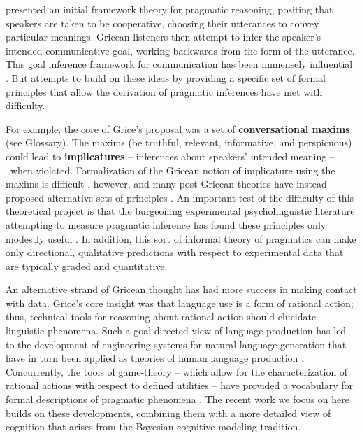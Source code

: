 \documentclass[]{elsarticle}
\begin{document}
\citet{grice1975} presented an initial framework theory for pragmatic
reasoning, positing that speakers are taken to be cooperative, choosing
their utterances to convey particular meanings. Gricean listeners then
attempt to infer the speaker's intended communicative goal, working
backwards from the form of the utterance. This goal inference
framework for communication has been immensely influential \cite[e.g.,][]{horn1984,sperber1986,clark1996,levinson2000}. But
attempts to build on these ideas by providing a specific set of formal
principles that allow the derivation of pragmatic inferences have met
with difficulty.

For example, the core of Grice's proposal was a set of
\textbf{conversational maxims} (see Glossary). The maxims (be truthful,
relevant, informative, and perspicuous) could lead to
\textbf{implicatures} -- inferences about speakers' intended meaning
--~when violated. Formalization of the Gricean notion of
implicature using the maxims is difficult \cite[e.g.,][]{hirschberg1985}, however, and many
post-Gricean theories have instead proposed alternative sets of
principles \citep{sperber1986,levinson2000}. An important test
of the difficulty of this theoretical project is that the burgeoning
experimental psycholinguistic literature attempting to measure pragmatic
inference has found these principles only modestly useful \citep{breheny2006,huang2009,noveck2008}. 
In addition, this sort of informal theory of pragmatics can make only directional,
qualitative predictions with respect to experimental data that are typically graded and
quantitative.

An alternative strand of Gricean thought has had more success in making
contact with data. Grice's core insight was that language use is a form
of rational action; thus, technical tools for reasoning about rational
action should elucidate linguistic phenomena. Such a goal-directed view
of language production has led to the development of engineering systems
for natural language generation \citep{dale1995} that have in turn
been applied as theories of human language production \citep[e.g.,][]{viethen2006}. 
Concurrently, the tools of game-theory -- which allow for
the characterization of rational actions with respect to defined
utilities -- have provided a vocabulary for formal descriptions of
pragmatic phenomena \citep[e.g.,][]{benz2006,jager2008}. The recent work we focus on
here builds on these developments, combining them with a more detailed
view of cognition that arises from the Bayesian cognitive modeling
tradition.
\end{document}
